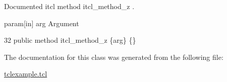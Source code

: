 Documented itcl method {\ttfamily itcl\+\_\+method\+\_\+z} . 

param\mbox{[}in\mbox{]} arg Argument 
\begin{DoxyCode}
32     \textcolor{keyword}{public} \textcolor{keyword}{method} itcl\_method\_z \{arg\} \{\}
\end{DoxyCode}


The documentation for this class was generated from the following file\+:\begin{DoxyCompactItemize}
\item 
\hyperlink{tclexample_8tcl}{tclexample.\+tcl}\end{DoxyCompactItemize}
